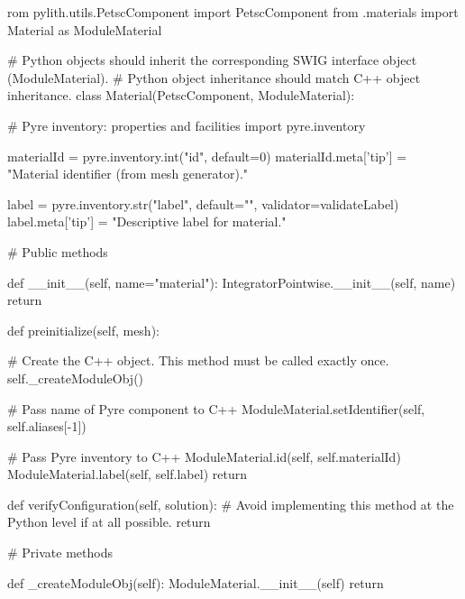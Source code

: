 \begin{python}
rom pylith.utils.PetscComponent import PetscComponent
from .materials import Material as ModuleMaterial

# Python objects should inherit the corresponding SWIG interface object (ModuleMaterial).
# Python object inheritance should match C++ object inheritance.
class Material(PetscComponent, ModuleMaterial):

    # Pyre inventory: properties and facilities
    import pyre.inventory

    materialId = pyre.inventory.int("id", default=0)
    materialId.meta['tip'] = "Material identifier (from mesh generator)."

    label = pyre.inventory.str("label", default="", validator=validateLabel)
    label.meta['tip'] = "Descriptive label for material."


    # Public methods

    def __init__(self, name="material"):
        IntegratorPointwise.__init__(self, name)
        return

    def preinitialize(self, mesh):

        # Create the C++ object. This method must be called exactly once.
        self._createModuleObj()

        # Pass name of Pyre component to C++
        ModuleMaterial.setIdentifier(self, self.aliases[-1])

        # Pass Pyre inventory to C++
        ModuleMaterial.id(self, self.materialId)
        ModuleMaterial.label(self, self.label)
        return

    def verifyConfiguration(self, solution):
        # Avoid implementing this method at the Python level if at all possible.
        return


    # Private methods

    def _createModuleObj(self):
        ModuleMaterial.__init__(self)
        return

\end{python}

